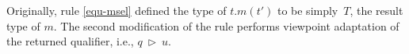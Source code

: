 Originally, rule \ref{equ-msel} defined the type of \mbox{$t.m(t')$}
to be simply~$T$, the result type of $m$.
The second modification of the rule performs viewpoint adaptation
of the returned qualifier, i.e., \mbox{$q\ \triangleright\ u$}.






\begin{comment}
\section{Auxiliary Functions} \label{dot-aux-functions}

I define a selection of auxiliary functions and operations to assist with
the modification of the DOT calculus.
These functions include $rcv$, $env$, $canSubst$, and $fieldAdj$.

The $rcv$ function takes a method label $m$, and returns the qualifier
on $m$'s receiver ({\cd this}) reference.
Scala's object-oriented formulation makes it easier to treat the receiver parameter
separately from other formal parameters (see the use of $rcv$ in rule \ref{equ-msel} below).

The $env$ function maps class labels and concrete types to their
associated environment references. The $env$ function is defined (section~\ref{dot-env-def})
such that non-conforming type selections cannot be used to construct new objects.

The $canSubst$ function (equation~\ref{equ-cansubst}) takes two qualifier arguments.
It returns true if the first qualifier argument can substitute for the second qualifier argument
in a method selection (see the method section rule~\ref{equ-msel}).
In general, if the second qualifier is polymorphic (e.g. $rothis$),
then the substitution is always possible.
Otherwise, the substitution is possible only if the first qualifier is a subtype
of the second qualifier.
\begin{equation*}\tag{CANSUBST}\label{equ-cansubst}
\begin{array}{lcll}
	canSubst(q,r) &=& \text{true} & \text{if}\ r = rothis \\
							&=& q <: r & \text{otherwise} \\
\end{array}
\end{equation*}


\end{comment}
